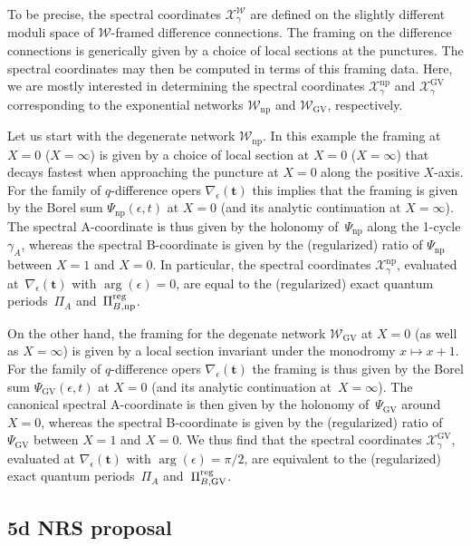 \documentclass[pdftex]{sigma}
\numberwithin{equation}{section}
\begin{document}
To be precise, the spectral coordinates $\mathcal{X}^\mathcal{W}_\gamma$ are defined on the slightly different moduli space of $\mathcal{W}$-framed difference connections. The framing on the difference connections is generically given by a choice of local sections at the punctures. The spectral coordinates may then be computed in terms of this framing data. Here, we are mostly interested in determining the spectral coordinates $\mathcal{X}^\mathrm{np}_\gamma$ and $\mathcal{X}^\mathrm{GV}_\gamma$ corresponding to the exponential networks $\mathcal{W}_\mathrm{np}$ and $\mathcal{W}_\mathrm{GV}$, respectively.

Let us start with the degenerate network $\mathcal{W}_\mathrm{np}$. In this example the framing at $X=0$ ($X=\infty$) is given by a choice of local section at $X=0$ ($X=\infty$) that decays fastest when approaching the puncture at $X=0$ along the positive $X$-axis. For the family of $q$-difference opers $\nabla_\epsilon(\mathbf{t})$ this implies that the framing is given by the Borel sum $\Psi_\mathrm{np}(\epsilon,t)$ at $X=0$ (and its analytic continuation at $X=\infty$). The spectral A-coordinate is thus given by the holonomy of~$\Psi_\mathrm{np}$ along the 1-cycle $\gamma_A$, whereas the spectral B-coordinate is given by the (regularized) ratio of $\Psi_\mathrm{np}$ between $X=1$ and $X=0$.
 In particular, the spectral coordinates $\mathcal{X}^{\mathrm{np}}_\gamma$, evaluated at~$\nabla_\epsilon(\mathbf{t})$ with $\arg(\epsilon) = 0$, are equal to the (regularized) exact quantum periods~$\Pi_{A}$ and~$\Pi^{\rm reg}_{B,\mathrm{np}}$.

On the other hand, the framing for the degenate network $\mathcal{W}_\mathrm{GV}$ at $X=0$ (as well as $X=\infty$) is given by a local section invariant under the monodromy $x \mapsto x+1$. For the family of $q$-difference opers $\nabla_\epsilon(\mathbf{t})$ the framing is thus given by the Borel sum $\Psi_\mathrm{GV}(\epsilon,t)$ at $X=0$ (and its analytic continuation at~$X=\infty$). The canonical spectral A-coordinate is then given by the holonomy of~$
\Psi_\mathrm{GV}$ around $X=0$, whereas the spectral B-coordinate is given by the (regularized) ratio of~$\Psi_\mathrm{GV}$ between $X=1$ and $X=0$. We thus find that the spectral coordinates $\mathcal{X}^{\mathrm{GV}}_\gamma$, evaluated at $\nabla_\epsilon(\mathbf{t})$ with $\arg(\epsilon) = \pi/2$, are equivalent to the (regularized) exact quantum periods~$\Pi_{A}$ and~$\Pi^{\rm reg}_{B,\mathrm{GV}}$.

\subsection{5d NRS proposal}\label{sec:NRS}
\end{document}
